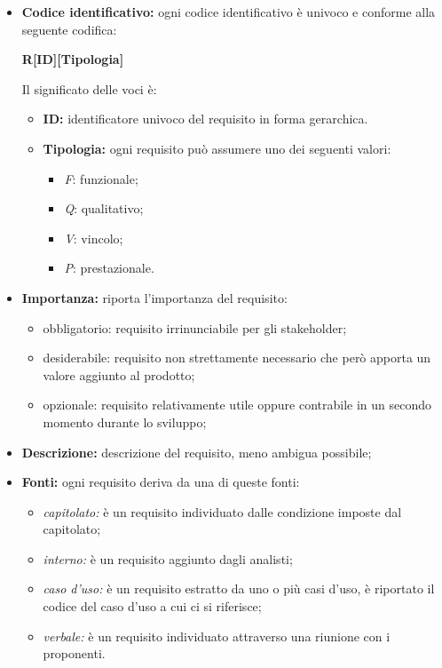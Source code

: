 \begin{itemize}
    \item \textbf{Codice identificativo:} ogni codice identificativo è univoco e conforme alla seguente codifica:
          \begin{center}
              \textbf{R[ID][Tipologia]}
          \end{center}
          Il significato delle voci è:
          \begin{itemize}
              \item \textbf{ID:} identificatore univoco del requisito in forma gerarchica.
              \item \textbf{Tipologia:} ogni requisito può assumere uno dei seguenti valori:
                    \begin{itemize}
                        \item \textit{F}: funzionale;
                        \item \textit{Q}: qualitativo;
                        \item \textit{V}: vincolo;
                        \item \textit{P}: prestazionale.
                    \end{itemize}
          \end{itemize}

    \item \textbf{Importanza:} riporta l'importanza del requisito:
          \begin{itemize}
              \item obbligatorio: requisito irrinunciabile per gli stakeholder;
              \item desiderabile: requisito non strettamente necessario che però apporta un valore aggiunto al prodotto;
              \item opzionale: requisito relativamente utile oppure contrabile in un secondo momento durante lo sviluppo;
          \end{itemize}
    \item \textbf{Descrizione:} descrizione del requisito, meno ambigua possibile;
    \item \textbf{Fonti:} ogni requisito deriva da una di queste fonti:
          \begin{itemize}
              \item \textit{capitolato:} è un requisito individuato dalle condizione imposte dal capitolato;
              \item \textit{interno:} è un requisito aggiunto dagli analisti;
              \item \textit{caso d'uso:} è un requisito estratto da uno o più casi d'uso, è riportato il codice del caso d'uso a cui ci si riferisce;
              \item \textit{verbale:} è un requisito individuato attraverso una riunione con i proponenti.
          \end{itemize}
\end{itemize}
